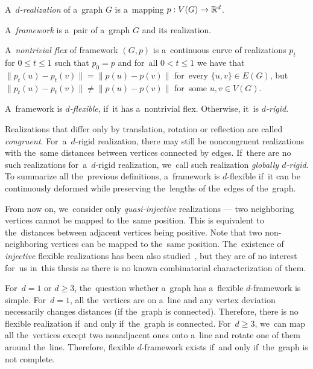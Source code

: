 %
\begin{definition}[\( d \)-realization]
	A~\emph{\( d \)-realization} of a~graph \( G \) is a~mapping \( p: V(G) \to \mathbb{R}^d \).
\end{definition}
%
\begin{definition}[Framework]
	A~\emph{framework} is a~pair of a~graph \( G \) and its realization.
\end{definition}
%
\begin{definition}
	A~\emph{nontrivial flex} of framework \( (G, p) \) is a~continuous curve of realizations \( p_t \)
	for \( 0 \le t \le 1\) such that
	\( p_0 = p \) and for~all \( 0 < t \le 1 \)
	we have that
	\( \|p_t(u) - p_t(v)\| = \|p(u) - p(v)\|\) for~every \( \{u, v\} \in E(G) \),
	but \( \|p_t(u) - p_t(v)\| \ne \|p(u) - p(v)\| \) for~some \( u, v \in V (G) \).
\end{definition}
%
\begin{definition}
	A~framework is \emph{\( d \)-flexible}, if~it has a~nontrivial flex.
	Otherwise, it~is \emph{\( d \)-rigid}.
\end{definition}
%
Realizations that differ only by translation,
rotation or reflection are called \emph{congruent}.
%
For~a~\( d \)-rigid realization, there may still be noncongruent realizations
with the~same distances between vertices connected by edges.
%
If~there are no such realizations for~a~\( d \)-rigid realization,
we~call such realization \emph{globally \( d \)-rigid}.
To summarize all the~previous definitions,
a~framework is \( d \)-flexible if~it can be continuously deformed
while preserving the~lengths of the~edges of the~graph.

From now on, we~consider only \emph{quasi-injective} realizations ---
two neighboring vertices cannot be mapped to the~same position.
This is equivalent to the~distances between adjacent vertices being positive.
Note that two non-neighboring vertices can be mapped to the~same position.
The~existence of \emph{injective} flexible realizations
has been also studied~\cite{injective_realizations},
but they are of no interest for~us in~this thesis
as there is no known combinatorial characterization of them.

For~\( d = 1 \) or \( d \ge 3 \),
the~question whether a~graph has a~flexible \( d \)-framework is simple.
%
For~\( d = 1 \), all the~vertices are on a~line
and any vertex deviation necessarily changes distances (if the~graph is connected).
Therefore, there is no flexible realization if~and only if~the~graph is connected.
%
For~\( d \ge 3 \), we~can map all the~vertices except two nonadjacent ones
onto a~line and rotate one of them around the~line.
Therefore, flexible \( d \)-framework exists if~and only if~the~graph is not complete.

